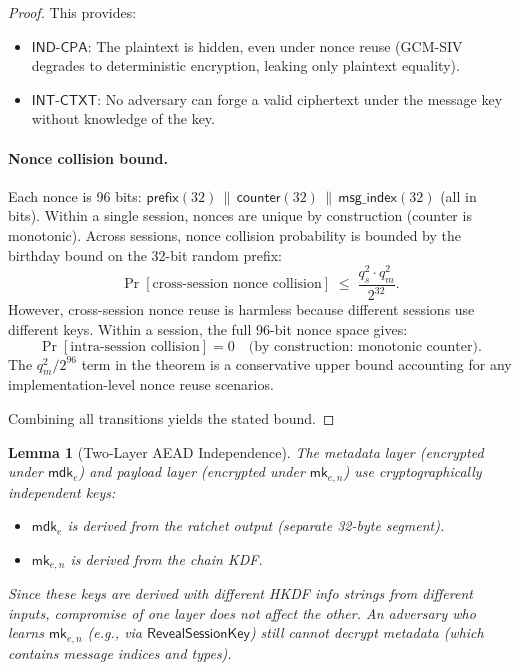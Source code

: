 \documentclass[11pt,a4paper]{article}
\newtheorem{lemma}[theorem]{Lemma}
\theoremstyle{definition}
\theoremstyle{remark}
\newcommand{\INDCPA}{\mathsf{IND\text{-}CPA}}
\newcommand{\INTCTXT}{\mathsf{INT\text{-}CTXT}}
\newcommand{\mk}{\mathsf{mk}}
\newcommand{\mdk}{\mathsf{mdk}}
\newcommand{\concat}{\,\|\,}
\begin{document}
\begin{proof}
This provides:
\begin{itemize}[nosep]
  \item $\INDCPA$: The plaintext is hidden, even under nonce reuse
        (GCM-SIV degrades to deterministic encryption, leaking only
        plaintext equality).
  \item $\INTCTXT$: No adversary can forge a valid ciphertext under the
        message key without knowledge of the key.
\end{itemize}

\paragraph{Nonce collision bound.}
Each nonce is 96 bits: $\mathsf{prefix}(32) \concat
\mathsf{counter}(32) \concat \mathsf{msg\_index}(32)$ (all in bits).
Within a single session, nonces are unique by construction (counter is
monotonic).  Across sessions, nonce collision probability is bounded by the
birthday bound on the 32-bit random prefix:
\[
  \Pr[\text{cross-session nonce collision}] \;\leq\; \frac{q_s^2 \cdot q_m^2}{2^{32}}.
\]
However, cross-session nonce reuse is harmless because different sessions
use different keys.  Within a session, the full 96-bit nonce space gives:
\[
  \Pr[\text{intra-session collision}] = 0 \quad\text{(by construction: monotonic counter)}.
\]
The $q_m^2 / 2^{96}$ term in the theorem is a conservative upper bound
accounting for any implementation-level nonce reuse scenarios.

Combining all transitions yields the stated bound. \qedhere
\end{proof}

\begin{lemma}[Two-Layer AEAD Independence]
\label{lem:two-layer}
The metadata layer (encrypted under $\mdk_e$) and payload layer (encrypted
under $\mk_{e,n}$) use cryptographically independent keys:
\begin{itemize}[nosep]
  \item $\mdk_e$ is derived from the ratchet output (separate 32-byte segment).
  \item $\mk_{e,n}$ is derived from the chain KDF.
\end{itemize}
Since these keys are derived with different HKDF info strings from
different inputs, compromise of one layer does not affect the other.
An adversary who learns $\mk_{e,n}$ (e.g., via $\mathsf{RevealSessionKey}$)
still cannot decrypt metadata (which contains message indices and types).
\end{lemma}
\end{document}
